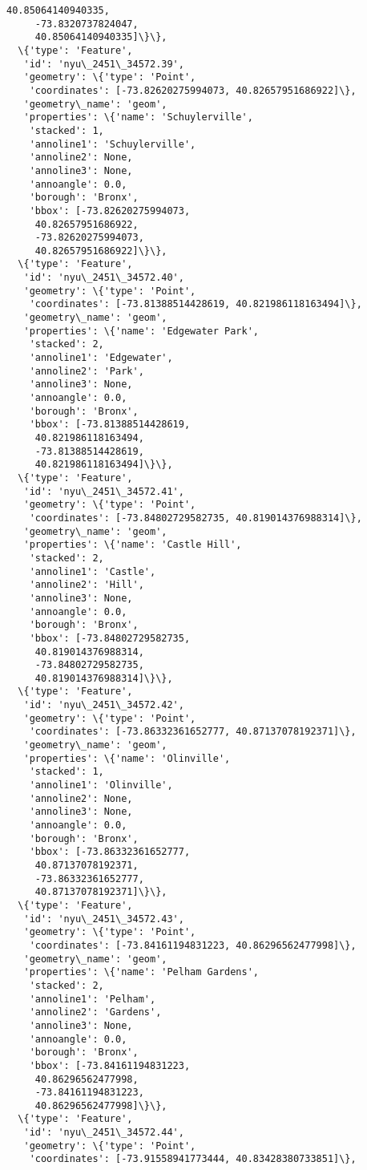 \documentclass[11pt]{article}
\begin{document}
\begin{tcolorbox}[breakable, size=fbox, boxrule=.5pt, pad at break*=1mm, opacityfill=0]
\begin{Verbatim}[commandchars=\\\{\}]
     40.85064140940335,
     -73.8320737824047,
     40.85064140940335]\}\},
  \{'type': 'Feature',
   'id': 'nyu\_2451\_34572.39',
   'geometry': \{'type': 'Point',
    'coordinates': [-73.82620275994073, 40.82657951686922]\},
   'geometry\_name': 'geom',
   'properties': \{'name': 'Schuylerville',
    'stacked': 1,
    'annoline1': 'Schuylerville',
    'annoline2': None,
    'annoline3': None,
    'annoangle': 0.0,
    'borough': 'Bronx',
    'bbox': [-73.82620275994073,
     40.82657951686922,
     -73.82620275994073,
     40.82657951686922]\}\},
  \{'type': 'Feature',
   'id': 'nyu\_2451\_34572.40',
   'geometry': \{'type': 'Point',
    'coordinates': [-73.81388514428619, 40.821986118163494]\},
   'geometry\_name': 'geom',
   'properties': \{'name': 'Edgewater Park',
    'stacked': 2,
    'annoline1': 'Edgewater',
    'annoline2': 'Park',
    'annoline3': None,
    'annoangle': 0.0,
    'borough': 'Bronx',
    'bbox': [-73.81388514428619,
     40.821986118163494,
     -73.81388514428619,
     40.821986118163494]\}\},
  \{'type': 'Feature',
   'id': 'nyu\_2451\_34572.41',
   'geometry': \{'type': 'Point',
    'coordinates': [-73.84802729582735, 40.819014376988314]\},
   'geometry\_name': 'geom',
   'properties': \{'name': 'Castle Hill',
    'stacked': 2,
    'annoline1': 'Castle',
    'annoline2': 'Hill',
    'annoline3': None,
    'annoangle': 0.0,
    'borough': 'Bronx',
    'bbox': [-73.84802729582735,
     40.819014376988314,
     -73.84802729582735,
     40.819014376988314]\}\},
  \{'type': 'Feature',
   'id': 'nyu\_2451\_34572.42',
   'geometry': \{'type': 'Point',
    'coordinates': [-73.86332361652777, 40.87137078192371]\},
   'geometry\_name': 'geom',
   'properties': \{'name': 'Olinville',
    'stacked': 1,
    'annoline1': 'Olinville',
    'annoline2': None,
    'annoline3': None,
    'annoangle': 0.0,
    'borough': 'Bronx',
    'bbox': [-73.86332361652777,
     40.87137078192371,
     -73.86332361652777,
     40.87137078192371]\}\},
  \{'type': 'Feature',
   'id': 'nyu\_2451\_34572.43',
   'geometry': \{'type': 'Point',
    'coordinates': [-73.84161194831223, 40.86296562477998]\},
   'geometry\_name': 'geom',
   'properties': \{'name': 'Pelham Gardens',
    'stacked': 2,
    'annoline1': 'Pelham',
    'annoline2': 'Gardens',
    'annoline3': None,
    'annoangle': 0.0,
    'borough': 'Bronx',
    'bbox': [-73.84161194831223,
     40.86296562477998,
     -73.84161194831223,
     40.86296562477998]\}\},
  \{'type': 'Feature',
   'id': 'nyu\_2451\_34572.44',
   'geometry': \{'type': 'Point',
    'coordinates': [-73.91558941773444, 40.83428380733851]\},

\end{Verbatim}
\end{tcolorbox}
\end{document}
